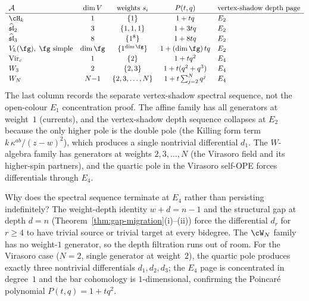\begin{computation}
\label{comp:concentration-data}
\[
\renewcommand{\arraystretch}{1.15}
\begin{array}{lcccl}
\cA & \dim V & \text{weights } s_i
 & P(t,q)
 & \text{vertex-shadow depth page} \\
\hline
\cH_k & 1 & \{1\}
 & 1+tq & E_2 \\
\widehat{\mathfrak{sl}}_2 & 3 & \{1,1,1\}
 & 1+3tq & E_2 \\
\widehat{\mathfrak{sl}}_3 & 8 & \{1^8\}
 & 1+8tq & E_2 \\
V_k(\fg),\;\fg\text{ simple} & \dim\fg & \{1^{\dim\fg}\}
 & 1+(\dim\fg)\,tq & E_2 \\
\mathrm{Vir}_c & 1 & \{2\}
 & 1+tq^2 & E_4 \\
W_3 & 2 & \{2,3\}
 & 1+t(q^2+q^3) & E_4 \\
W_N & N{-}1 & \{2,3,\ldots,N\}
 & 1+t\sum_{j=2}^N q^j & E_4
\end{array}
\]
The last column records the separate vertex-shadow spectral sequence,
not the open-colour \(E_1\) concentration proof.  The affine family has
all generators at weight~$1$ (currents), and the vertex-shadow depth
sequence collapses at $E_2$ because the only higher pole is the double
pole (the Killing form term $k\,\kappa^{ab}/(z{-}w)^2$), which
produces a single nontrivial differential $d_1$. The
$W$-algebra family has generators at weights
$2,3,\ldots,N$ (the Virasoro field and its higher-spin
partners), and the quartic pole in the Virasoro self-OPE
forces differentials through $E_4$.

Why does the spectral sequence terminate at $E_4$
rather than persisting indefinitely? The
weight-depth identity $w + d = n - 1$ and the
structural gap at depth $d = n$
(Theorem~\ref{thm:gap-migration}(i)--(ii))
force the differential $d_r$ for $r \ge 4$ to have
trivial source or trivial target at every bidegree.
The $\cW_N$ family has no weight-$1$ generator, so the
depth filtration runs out of room. For the Virasoro
case ($N = 2$, single generator at weight~$2$), the
quartic pole produces exactly three nontrivial
differentials $d_1, d_2, d_3$; the $E_4$ page is
concentrated in degree~$1$ and the bar cohomology is
$1$-dimensional, confirming the Poincar\'e polynomial
$P(t,q) = 1 + tq^2$.
\end{computation}

